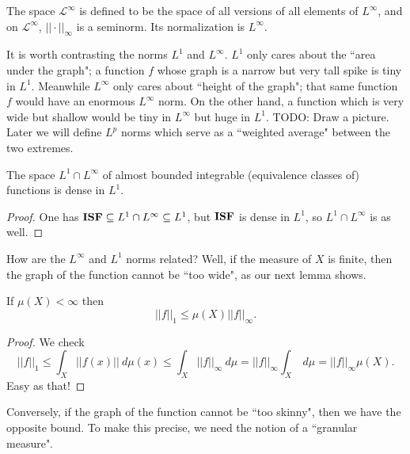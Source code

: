 \begin{subsec}
The space $\mathcal L^\infty$ is defined to be the space of all versions of all elements of $L^\infty$, and on $\mathcal L^\infty$, $||\cdot||_\infty$ is a seminorm. Its normalization is $L^\infty$.
\end{subsec}

\begin{subsec}
It is worth contrasting the norms $L^1$ and $L^\infty$. $L^1$ only cares about the ``area under the graph"; a function $f$ whose graph is a narrow but very tall spike is tiny in $L^1$. Meanwhile $L^\infty$ only cares about ``height of the graph"; that same function $f$ would have an enormous $L^\infty$ norm.
On the other hand, a function which is very wide but shallow would be tiny in $L^\infty$ but huge in $L^1$. TODO: Draw a picture.
Later we will define $L^p$ norms which serve as a ``weighted average" between the two extremes.
\end{subsec}

\begin{lemma}
The space $L^1 \cap L^\infty$ of almost bounded integrable (equivalence classes of) functions is dense in $L^1$.
\end{lemma}
\begin{proof}
One has $\mathbf{ISF} \subseteq L^1 \cap L^{\infty} \subseteq L^1$, but $\mathbf{ISF}$ is dense in $L^1$, so $L^1 \cap L^\infty$ is as well.
\end{proof}

\begin{subsec}
How are the $L^\infty$ and $L^1$ norms related?
Well, if the measure of $X$ is finite, then the graph of the function cannot be ``too wide", as our next lemma shows.
\end{subsec}

\begin{lemma}
If $\mu(X) < \infty$ then
\[||f||_1 \leq \mu(X) ||f||_\infty.\]
\end{lemma}
\begin{proof}
We check
\[||f||_1 \leq \int_{X} ||f(x)||~d\mu(x) \leq \int_{X} ||f||_{\infty} ~d\mu = ||f||_{\infty} \int_{X} ~d\mu = ||f||_{\infty} \mu(X).\]
Easy as that!
\end{proof}

\begin{subsec}
Conversely, if the graph of the function cannot be ``too skinny", then we have the opposite bound.
To make this precise, we need the notion of a ``granular measure".
\end{subsec}

